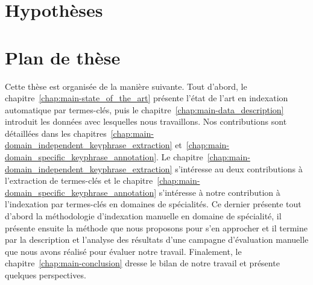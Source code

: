 
  \section{Hypothèses}
  \label{sec:main-introduction-hypothesis}





  \section{Plan de thèse}
  \label{sec:main-introduction-outline}
    Cette thèse est organisée de la manière suivante. Tout d'abord, le
    chapitre~\ref{chap:main-state_of_the_art} présente l'état de l'art en
    indexation automatique par termes-clés, puis le
    chapitre~\ref{chap:main-data_description} introduit les données avec
    lesquelles nous travaillons. Nos contributions sont détaillées dans les
    chapitres~\ref{chap:main-domain_independent_keyphrase_extraction}
    et~\ref{chap:main-domain_specific_keyphrase_annotation}. Le
    chapitre~\ref{chap:main-domain_independent_keyphrase_extraction} s'intéresse
    au deux contributions à l'extraction de termes-clés et le
    chapitre~\ref{chap:main-domain_specific_keyphrase_annotation} s'intéresse à
    notre contribution à l'indexation par termes-clés en domaines de
    spécialités. Ce dernier présente tout d'abord la méthodologie d'indexation
    manuelle en domaine de spécialité, il présente ensuite la méthode que nous
    proposons pour s'en approcher et il termine par la description et l'analyse
    des résultats d'une campagne d'évaluation manuelle que nous avons réalisé
    pour évaluer notre travail. Finalement, le
    chapitre~\ref{chap:main-conclusion} dresse le bilan de notre travail et
    présente quelques perspectives.

